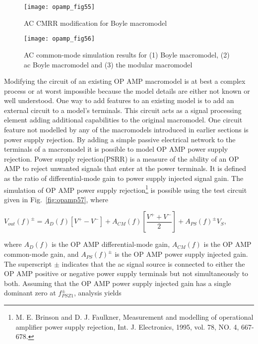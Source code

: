 \begin{figure} 
  \centering
  \texttt{[image: opamp\_fig55]}
  \caption{AC CMRR modification for Boyle macromodel} 
  \label{fig:opamp55}
\end{figure}

\begin{figure} 
  \centering
  \texttt{[image: opamp\_fig56]}
  \caption{AC common-mode simulation results for (1) Boyle macromodel, (2) ac Boyle macromodel and (3) the modular macromodel} 
  \label{fig:opamp56}
\end{figure}

\medskip 

Modifying the circuit of an existing OP AMP macromodel is at best a complex process or at worst impossible because the model details are either not known or well understood. One way to add features to an existing model is to add an external circuit to a model's terminals.  This circuit acts as a signal processing element adding additional capabilities to the original macromodel. One circuit feature not modelled by any of the macromodels introduced in earlier sections is power supply rejection. By adding a simple passive electrical network to the terminals of a macromodel it is possible to model OP AMP power supply rejection.  Power supply rejection(PSRR) is a measure of the ability of an OP AMP to reject unwanted signals that enter at the power terminals. It is defined as the ratio of differential-mode gain to power supply injected signal gain. The simulation of OP AMP power supply rejection\footnote{M. E. Brinson and D. J. Faulkner, Measurement and modelling of operational amplifier power supply rejection, Int. J. Electronics, 1995, vol. 78, NO. 4, 667-678.} is possible using the test circuit given in Fig.~\ref{fig:opamp57}, where

\medskip 
$V_{out}(f)^{\pm}=A_{D}(f)\left[ V^{+} - V^{-}\right] +A_{CM}(f)\left[ \dfrac{V^{+} + V^{-}}{2}\right] +A_{PS}(f)^{\pm}V_{S} $,

\medskip 
where $A_{D}(f)$ is the OP AMP differential-mode gain, $A_{CM}(f)$ is the OP AMP common-mode gain, and $A_{PS}(f)^{\pm}$ is the OP AMP power supply injected gain.  The superscript $\pm$ indicates that the ac signal source is connected to either the OP AMP positive or negative power supply terminals but not simultaneously to both.  Assuming that the OP AMP power supply injected gain has a single dominant zero at $f_{PSZ1}^{\pm}$, analysis yields


